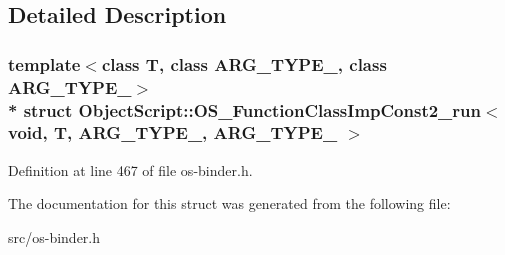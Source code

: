 \subsection{Detailed Description}
\subsubsection*{template$<$class T, class A\+R\+G\+\_\+\+T\+Y\+P\+E\+\_, class A\+R\+G\+\_\+\+T\+Y\+P\+E\+\_$>$\\*
struct Object\+Script\+::\+O\+S\+\_\+\+Function\+Class\+Imp\+Const2\+\_\+run$<$ void, T,   A\+R\+G\+\_\+\+T\+Y\+P\+E\+\_, A\+R\+G\+\_\+\+T\+Y\+P\+E\+\_ $>$}



Definition at line 467 of file os-\/binder.\+h.



The documentation for this struct was generated from the following file\+:\begin{DoxyCompactItemize}
\item 
src/os-\/binder.\+h\end{DoxyCompactItemize}
